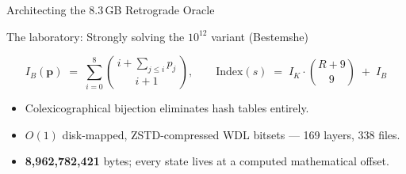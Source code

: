 \documentclass[aspectratio=169]{beamer}
\renewcommand{\framesubtitle}[1]{%
  {\usebeamerfont{framesubtitle}\color{cMuted}\small #1\par\vspace{3pt}}}
\begin{document}

\begin{frame}{Architecting the 8.3\,GB Retrograde Oracle}
  \framesubtitle{The laboratory: Strongly solving the $10^{12}$ variant (Bestemshe)}
  \centering

  \vspace{-0.1cm}
  \begin{equation*}
    I_B(\mathbf{p}) \;=\; \sum_{i=0}^{8}\binom{\,i+\sum_{j\le i}p_j\,}{\,i+1\,},
    \qquad
    \mathrm{Index}(s) \;=\; I_K\cdot\binom{R+9}{9} \;+\; I_B
  \end{equation*}

  \begin{itemize}
    \item Colexicographical bijection eliminates hash tables entirely. 
    \item $O(1)$ disk-mapped, ZSTD-compressed WDL bitsets --- 169 layers, 338 files.
    \item \textbf{8{,}962{,}782{,}421} bytes; every state lives at a computed mathematical offset.
  \end{itemize}
\end{frame}
\end{document}
